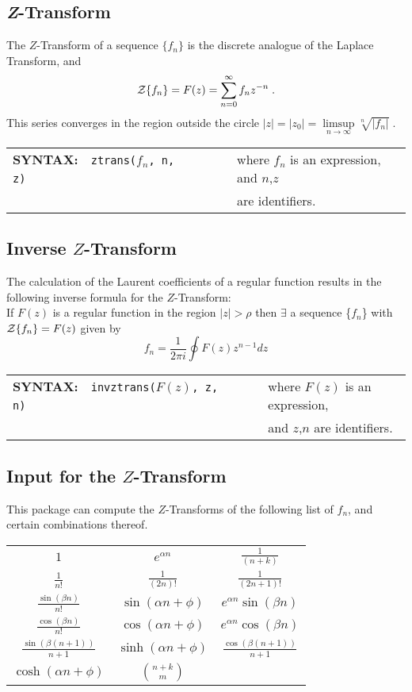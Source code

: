 
\subsection[Z-Transform]{\textit{Z}-Transform}
  The $Z$-Transform of a sequence $\{f_n\}$ is the discrete analogue
  of the Laplace Transform, and
  \[{\cal Z}\{f_n\} = F(z) = \sum^\infty_{n=0} f_nz^{-n}\;.\]
  This series converges in the region outside the circle
  $|z|=|z_0|= \limsup\limits_{n \rightarrow \infty} \sqrt[n]{|f_n|}\;.$


\begin{tabular}{@{}l@{}l}
  {\bf SYNTAX:}\ \ {\tt ztrans($f_n$, n,  z)}\ \ \ \ \ \ \ \
  & where $f_n$ is an expression, and $n$,$z$ \\
  & are identifiers.
\end{tabular}


\subsection[Inverse Z-Transform]{Inverse $Z$-Transform}
  The calculation of the Laurent coefficients of a regular function
  results in the following inverse formula for the $Z$-Transform:
  \\
  If $F(z)$ is a regular function in the region $|z|> \rho$ then
  $\exists$ a sequence \{$f_n$\} with ${\cal Z} \{f_n\}=F(z)$
  given by
  \[f_n = \frac{1}{2 \pi i}\oint F(z) z^{n-1} dz\]


\begin{tabular}{@{}l@{}l}
  {\bf SYNTAX:}\ \ {\tt invztrans($F(z)$, z,  n)}\ \ \ \ \ \ \ \
  & where $F(z)$ is an expression, \\
  & and $z$,$n$ are identifiers.
\end{tabular}


\subsection[Input for the Z-Transform]{Input for the $Z$-Transform}

This package can compute the $Z$-Transforms of the following
list of $f_n$, and certain combinations thereof.

\begin{center}
  \renewcommand{\arraystretch}{2}
  \setlength{\tabcolsep}{5mm}
  \begin{tabular}{ccc}
    $1$ & $e^{\alpha n}$ & $\frac{1}{(n+k)}$ \\
    $\frac{1}{n!}$ & $\frac{1}{(2n)!}$ & $\frac{1}{(2n+1)!}$ \\
    $\frac{\sin(\beta n)}{n!}$ & $\sin(\alpha n+\phi)$ & $e^{\alpha n} \sin(\beta n)$ \\
    $\frac{\cos(\beta n)}{n!}$ & $\cos(\alpha n+\phi)$ & $e^{\alpha n} \cos(\beta n)$ \\
    $\frac{\sin(\beta (n+1))}{n+1}$ & $\sinh(\alpha n+\phi)$ & $\frac{\cos(\beta (n+1))}{n+1}$ \\
    $\cosh(\alpha n+\phi)$ & $\binom{n+k}{m}$
  \end{tabular}
\end{center}

